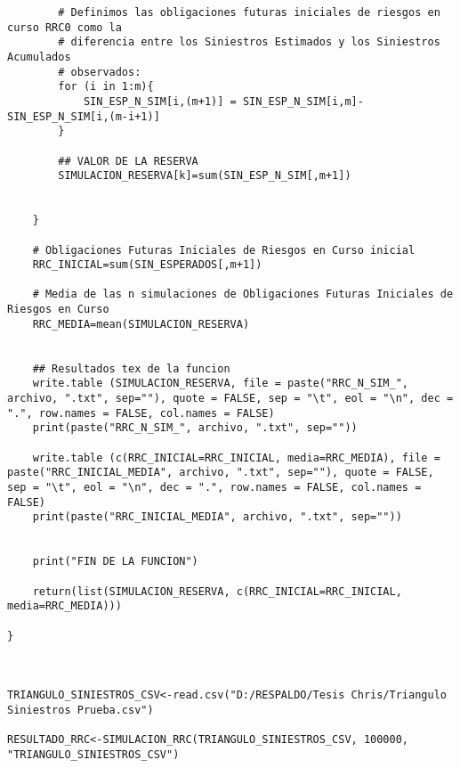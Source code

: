 \documentclass[11pt,twoside,openright,spanish]{report}
\numberwithin{equation}{chapter}
\numberwithin{figure}{chapter}
\numberwithin{table}{chapter}
\begin{document}
\begin{lstlisting}
		# Definimos las obligaciones futuras iniciales de riesgos en curso RRC0 como la 
		# diferencia entre los Siniestros Estimados y los Siniestros Acumulados
		# observados:
		for (i in 1:m){
			SIN_ESP_N_SIM[i,(m+1)] = SIN_ESP_N_SIM[i,m]-SIN_ESP_N_SIM[i,(m-i+1)]
		}
		
		## VALOR DE LA RESERVA
		SIMULACION_RESERVA[k]=sum(SIN_ESP_N_SIM[,m+1])
		
		
	}
	
	# Obligaciones Futuras Iniciales de Riesgos en Curso inicial
	RRC_INICIAL=sum(SIN_ESPERADOS[,m+1])
	
	# Media de las n simulaciones de Obligaciones Futuras Iniciales de Riesgos en Curso
	RRC_MEDIA=mean(SIMULACION_RESERVA)
	
	
	## Resultados tex de la funcion
	write.table (SIMULACION_RESERVA, file = paste("RRC_N_SIM_", archivo, ".txt", sep=""), quote = FALSE, sep = "\t", eol = "\n", dec = ".", row.names = FALSE, col.names = FALSE)
	print(paste("RRC_N_SIM_", archivo, ".txt", sep=""))
	
	write.table (c(RRC_INICIAL=RRC_INICIAL, media=RRC_MEDIA), file = paste("RRC_INICIAL_MEDIA", archivo, ".txt", sep=""), quote = FALSE, sep = "\t", eol = "\n", dec = ".", row.names = FALSE, col.names = FALSE)
	print(paste("RRC_INICIAL_MEDIA", archivo, ".txt", sep=""))
	
	
	print("FIN DE LA FUNCION")
	
	return(list(SIMULACION_RESERVA, c(RRC_INICIAL=RRC_INICIAL, media=RRC_MEDIA)))
	
}



TRIANGULO_SINIESTROS_CSV<-read.csv("D:/RESPALDO/Tesis Chris/Triangulo Siniestros Prueba.csv")

RESULTADO_RRC<-SIMULACION_RRC(TRIANGULO_SINIESTROS_CSV, 100000, "TRIANGULO_SINIESTROS_CSV")


\end{lstlisting}

	
	\pagestyle{empty}

	
\end{document}
